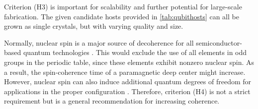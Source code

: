\begin{table}[!ht]
\centering
\caption{Table taken from \citeauthor{Gordon2013} \cite{Gordon2013} that lists a number of tetrahedrally coordinated hosts whose band gaps are larger than $2.0$ (eV), and compares it to diamond and Si. All experimental values are from Ref. \cite{Martienssen2005}, except for where explicitly cited otherwise. }
\label{tab:qubithosts}
\noindent{}
\end{table}

Criterion (H3) is important for scalability and further potential for large-scale fabrication. The given candidate hosts provided in \autoref{tab:qubithosts} can all be grown as single crystals, but with varying quality and size.

\noindent Normally, nuclear spin is a major source of decoherence for all semiconductor-based quantum technologies \cite{Ladd2010}. This would exclude the use of all elements in odd groups in the periodic table, since these elements exhibit nonzero nuclear spin. As a result, the spin-coherence time of a paramagnetic deep center \cite{Weber2010} might increase. However, nuclear spin can also induce additional quantum degrees of freedom for applications in the proper configuration \cite{Bassett2019}. Therefore, criterion (H4) is not a strict requirement but is a general recommendation for increasing coherence.  %


